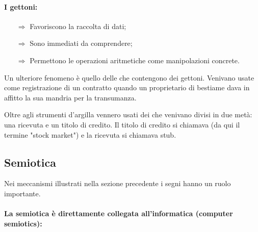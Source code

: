 \paragraph{I gettoni:}

\begin{itemize}
    \item [$\Rightarrow$] Favoriscono la raccolta di dati;
    \item [$\Rightarrow$] Sono immediati da comprendere;
    \item [$\Rightarrow$] Permettono le operazioni aritmetiche come manipolazioni concrete.
\end{itemize}

Un ulteriore fenomeno è quello delle  che contengono dei gettoni. Venivano usate come registrazione di un contratto quando un proprietario di bestiame dava in affitto la sua mandria per la transumanza.

Oltre agli strumenti d'argilla vennero usati dei  che venivano divisi in due metà: una ricevuta e un titolo di credito. Il titolo di credito si chiamava  (da qui il termine "stock market") e la ricevuta si chiamava stub.

\subsection{Semiotica}

Nei meccanismi illustrati nella sezione precedente i segni hanno un ruolo importante. 



\paragraph{La semiotica è direttamente collegata all'informatica (computer semiotics):}


